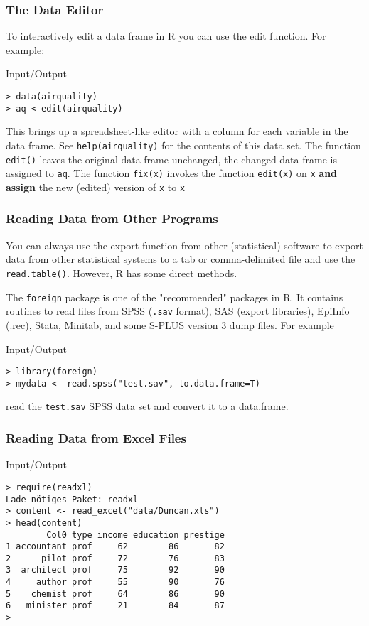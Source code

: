 \documentclass[xcolor={table},c]{beamer}
\begin{document}
\begin{frame}[fragile]\frametitle{The Data Editor}
To interactively edit a data frame in R you can use the edit function. For example:
\begin{exampleblock}{Input/Output}
\begin{verbatim}
> data(airquality)
> aq <-edit(airquality)
\end{verbatim}
\end{exampleblock}
This brings up a spreadsheet-like editor with a column for each variable in the data frame.
 See \texttt{help(airquality)}  for the contents of this data set.
The function \texttt{edit()} leaves the original data frame unchanged, the changed data frame is assigned to \texttt{aq}. The function \texttt{fix(x)} invokes the function \texttt{edit(x)} on \texttt{x} \textbf{and assign} the new (edited) version of \texttt{x} to \texttt{x}  
\end{frame}


\begin{frame}[fragile]\frametitle{Reading Data from Other Programs}
You can always use the export function from other (statistical) software to export data from other statistical systems to a tab or comma-delimited file and use the \texttt{read.table()}. However, R has some direct methods. 

The \texttt{foreign} package is one of the "recommended" packages in R. It contains routines to read files from SPSS (\texttt{.sav} format), SAS (export libraries), EpiInfo (.rec), Stata, Minitab, and some S-PLUS version 3 dump files. For example
\begin{exampleblock}{Input/Output}
\begin{verbatim}
> library(foreign)
> mydata <- read.spss("test.sav", to.data.frame=T)
\end{verbatim}
\end{exampleblock}
read the \texttt{test.sav} SPSS data set and convert it to a data.frame.
\end{frame}

\begin{frame}[fragile]\frametitle{Reading Data from Excel Files}
\begin{exampleblock}{Input/Output}
\small
\begin{verbatim}
> require(readxl)
Lade nötiges Paket: readxl
> content <- read_excel("data/Duncan.xls")
> head(content)
        Col0 type income education prestige
1 accountant prof     62        86       82
2      pilot prof     72        76       83
3  architect prof     75        92       90
4     author prof     55        90       76
5    chemist prof     64        86       90
6   minister prof     21        84       87
> 
\end{verbatim}
\end{exampleblock}
\end{frame}
\end{document}
